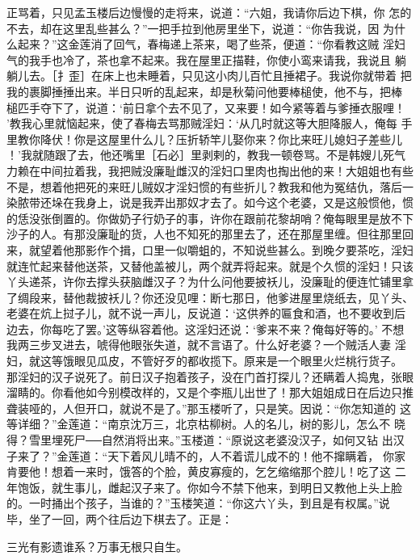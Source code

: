 正骂着，只见孟玉楼后边慢慢的走将来，说道：“六姐，我请你后边下棋，你
怎的不去，却在这里乱些甚么？”一把手拉到他房里坐下，说道：“你告我说，因
为什么起来？”这金莲消了回气，春梅递上茶来，喝了些茶，便道：“你看教这贼
淫妇气的我手也冷了，茶也拿不起来。我在屋里正描鞋，你使小鸾来请我，我说且
躺躺儿去。［扌歪］在床上也未睡着，只见这小肉儿百忙且捶裙子。我说你就带着
把我的裹脚捶捶出来。半日只听的乱起来，却是秋菊问他要棒槌使，他不与，把棒
槌匹手夺下了，说道：‘前日拿个去不见了，又来要！如今紧等着与爹捶衣服哩！
’教我心里就恼起来，使了春梅去骂那贼淫妇：‘从几时就这等大胆降服人，俺每
手里教你降伏！你是这屋里什么儿？压折轿竿儿娶你来？你比来旺儿媳妇子差些儿
！’我就随跟了去，他还嘴里［石必］里剥剌的，教我一顿卷骂。不是韩嫂儿死气
力赖在中间拉着我，我把贼没廉耻雌汉的淫妇口里肉也掏出他的来！大姐姐也有些
不是，想着他把死的来旺儿贼奴才淫妇惯的有些折儿？教我和他为冤结仇，落后一
染脓带还垛在我身上，说是我弄出那奴才去了。如今这个老婆，又是这般惯他，惯
的恁没张倒置的。你做奶子行奶子的事，许你在跟前花黎胡哨？俺每眼里是放不下
沙子的人。有那没廉耻的货，人也不知死的那里去了，还在那屋里缠。但往那里回
来，就望着他那影作个揖，口里一似嚼蛆的，不知说些甚么。到晚夕要茶吃，淫妇
就连忙起来替他送茶，又替他盖被儿，两个就弄将起来。就是个久惯的淫妇！只该
丫头递茶，许你去撑头获脑雌汉子？为什么问他要披袄儿，没廉耻的便连忙铺里拿
了绸段来，替他裁披袄儿？你还没见哩：断七那日，他爹进屋里烧纸去，见丫头、
老婆在炕上挝子儿，就不说一声儿，反说道：‘这供养的匾食和酒，也不要收到后
边去，你每吃了罢。’这等纵容着他。这淫妇还说：‘爹来不来？俺每好等的。’
不想我两三步叉进去，唬得他眼张失道，就不言语了。什么好老婆？一个贼活人妻
淫妇，就这等饿眼见瓜皮，不管好歹的都收揽下。原来是一个眼里火烂桃行货子。
那淫妇的汉子说死了。前日汉子抱着孩子，没在门首打探儿？还瞒着人捣鬼，张眼
溜睛的。你看他如今别模改样的，又是个李瓶儿出世了！那大姐姐成日在后边只推
聋装哑的，人但开口，就说不是了。”那玉楼听了，只是笑。因说：“你怎知道的
这等详细？”金莲道：“南京沈万三，北京枯柳树。人的名儿，树的影儿，怎么不
晓得？雪里埋死尸──自然消将出来。”玉楼道：“原说这老婆没汉子，如何又钻
出汉子来了？”金莲道：“天下着风儿晴不的，人不着谎儿成不的！他不撺瞒着，
你家肯要他！想着一来时，饿答的个脸，黄皮寡瘦的，乞乞缩缩那个腔儿！吃了这
二年饱饭，就生事儿，雌起汉子来了。你如今不禁下他来，到明日又教他上头上脸
的。一时捅出个孩子，当谁的？”玉楼笑道：“你这六丫头，到且是有权属。”说
毕，坐了一回，两个往后边下棋去了。正是：

三光有影遗谁系？万事无根只自生。

